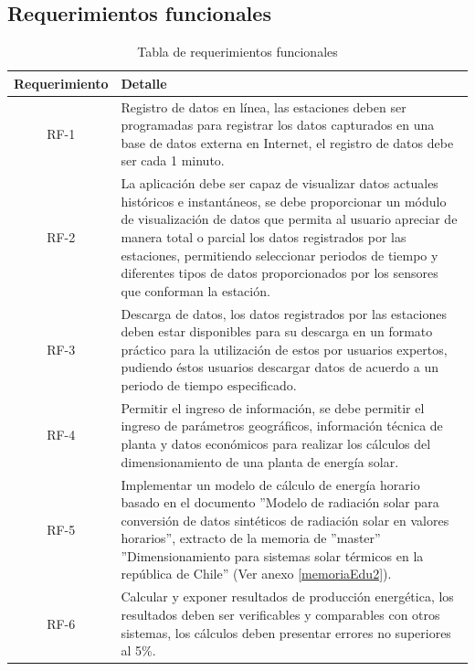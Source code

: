 \subsection{Requerimientos funcionales}
\begin{table}[h!]
\caption{Tabla de requerimientos funcionales}
\label{tablaFuncional}
\begin{tabular}{| c | p{11cm} |}
	\hline
	\textbf{Requerimiento}	&	\textbf{Detalle}	\\
	\hline
	RF-1	&	Registro de datos en línea, las estaciones deben ser programadas para registrar los datos capturados en una base de datos externa en Internet, el registro de datos debe ser cada 1 minuto.	\\
	\hline
	RF-2	&	La aplicación debe ser capaz de visualizar datos actuales históricos e instantáneos, se debe proporcionar un módulo de visualización de datos que permita al usuario apreciar de manera total o parcial los datos registrados por las estaciones, permitiendo seleccionar periodos de tiempo y diferentes tipos de datos proporcionados por los sensores que conforman la estación.\\
	\hline
	RF-3	&	Descarga de datos, los datos registrados por las estaciones deben estar disponibles para su descarga en un formato práctico para la utilización de estos por usuarios expertos, pudiendo éstos usuarios descargar datos de acuerdo a un periodo de tiempo especificado.	\\
	\hline
	RF-4	&	Permitir el ingreso de información, se debe permitir el ingreso de parámetros geográficos, información técnica de planta y datos económicos para realizar los cálculos del dimensionamiento de una planta de energía solar.\\
	\hline
	RF-5	&	Implementar un modelo de cálculo de energía horario basado en el documento ''Modelo de radiación solar para conversión de datos sintéticos de radiación solar en valores horarios'', extracto de la memoria de ''master'' ''Dimensionamiento para sistemas solar térmicos en la república de Chile\cite{memoriaEdu}'' (Ver anexo \ref{memoriaEdu2}).\\
	\hline
	RF-6	&	Calcular y exponer resultados de producción energética, los resultados deben ser verificables y comparables con otros sistemas, los cálculos deben presentar errores no superiores al 5\%.\\
	\hline
\end{tabular}
\end{table}

